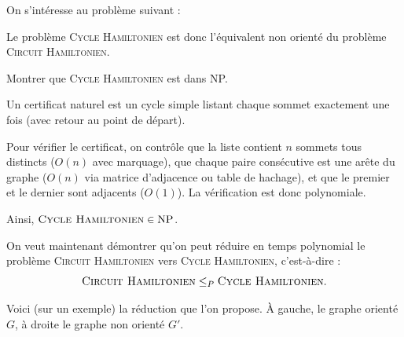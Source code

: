 
\begingroup

\begin{exercice}[Le problème \textsc{Cycle Hamiltonien}\footnote{\textit{Source :} \url{https://www.youtube.com/watch?v=kl2k_wgYYic}.}]

  On s'intéresse au problème suivant :


  Le problème \textsc{Cycle Hamiltonien} est donc l'équivalent non orienté du problème \textsc{Circuit Hamiltonien}.

  \begin{question}
  \item Montrer que \textsc{Cycle Hamiltonien} est dans NP.
  \end{question}
  \begin{correction}
    Un certificat naturel est un cycle simple listant chaque sommet exactement une fois (avec retour au point de départ).

    Pour vérifier le certificat, on contrôle que la liste contient $n$ sommets
    tous distincts ($O(n)$ avec marquage), que chaque paire consécutive est une
    arête du graphe ($O(n)$ via matrice d'adjacence ou table de hachage),
    et que le premier et le dernier sont adjacents ($O(1)$).
    La vérification est donc polynomiale.
    
    Ainsi, $\textsc{Cycle Hamiltonien} \in \text{NP}$.
  \end{correction}
  
  On veut maintenant démontrer qu'on peut réduire en temps polynomial le problème \textsc{Circuit Hamiltonien} vers \textsc{Cycle Hamiltonien}, c'est-à-dire :
  $$\textsc{Circuit Hamiltonien} \le_P \textsc{Cycle Hamiltonien}.$$
  
  Voici (sur un exemple) la réduction que l'on propose.
  À gauche, le graphe orienté $G$, à droite le graphe non orienté $G'$.

  \begin{center}
\end{center}
\end{exercice}
